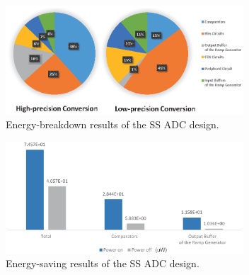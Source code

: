 \begin{figure}[htbp]
	\centerline{\includegraphics[width=3.5in]{./Figures/SSResults1.eps}}
	\caption{Energy-breakdown results of the SS ADC design.}
	\label{SSresults1}
\end{figure}

\begin{figure}[htbp]
	\centerline{\includegraphics[width=3.5in]{./Figures/SSResults2.eps}}
	\caption{Energy-saving results of the SS ADC design.}
	\label{SSresults2}
\end{figure} 

